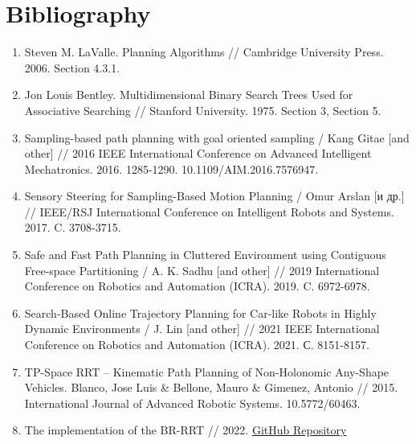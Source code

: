 \documentclass[a4paper,12pt]{article}
\newcommand{\numenum}[1]{\begin{enumerate}[label=\arabic*.]#1\end{enumerate}}
\DeclareRobustCommand{\[}{\begin{equation}}
\DeclareRobustCommand{\]}{\end{equation}}
\numberwithin{equation}{section}
\numberwithin{algorithm}{section}
\begin{document}
\pagebreak
\section{Bibliography}

\numenum{
\item Steven M. LaValle. Planning Algorithms // Cambridge University Press. 2006. Section 4.3.1.
\item Jon Louis Bentley. Multidimensional Binary Search Trees Used for Associative Searching // Stanford University. 1975. Section 3, Section 5.
\item Sampling-based path planning with goal oriented sampling / Kang Gitae [and other] // 2016 IEEE International Conference on Advanced Intelligent Mechatronics. 2016. 1285-1290. 10.1109/AIM.2016.7576947. 
\item Sensory Steering for Sampling-Based Motion Planning / Omur Arslan [и др.] // IEEE/RSJ International Conference on Intelligent Robots and Systems. 2017. C. 3708-3715.
\item Safe and Fast Path Planning in Cluttered Environment using Contiguous Free-space Partitioning / A. K. Sadhu [and other] // 2019 International Conference on Robotics and Automation (ICRA). 2019. C. 6972-6978.
\item Search-Based Online Trajectory Planning for Car-like Robots in Highly Dynamic Environments / J. Lin [and other] // 2021 IEEE International Conference on Robotics and Automation (ICRA). 2021. С. 8151-8157.
\item TP-Space RRT – Kinematic Path Planning of Non-Holonomic Any-Shape Vehicles. Blanco, Jose Luis & Bellone, Mauro & Gimenez, Antonio // 2015. International Journal of Advanced Robotic Systems. 10.5772/60463.
\item The implementation of the BR-RRT // 2022. \href{https://github.com/Alex-Blade/KinodynamicMotionPlanning}{GitHub Repository}
}
\end{document}
